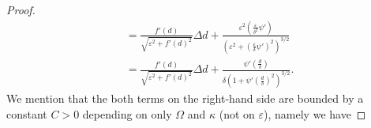 \documentclass[11pt]{article}
\numberwithin{equation}{section}
\newcommand{\fix}[1]{\textcolor{red}{#1}}
\def\leq{\leqslant}
\begin{document}
\begin{proof}
\begin{align*}
&= \frac{f'(d)}{\sqrt{\varepsilon^2 + f'(d)^2}} \Delta d + \frac{\varepsilon^2 \left( \frac{\varepsilon}{\delta^2} \psi' \right)}{\left(\varepsilon^2 + \left(\frac{\varepsilon}{\delta} \psi'\right)^2\right)^{3/2}} \\
&= \frac{f'(d)}{\sqrt{\varepsilon^2 + f'(d)^2}} \Delta d + \frac{\psi'\left(\frac{d}{\delta}\right)}{\delta \left(1 + \psi'\left(\frac{d}{\delta}\right)^2\right)^{3/2}}.
\end{align*}
We mention that the both terms on the right-hand side are bounded by a constant $C>0$ depending on only $\Omega$ and $\kappa$ (not on $\varepsilon$), namely we have



\end{proof}
\end{document}
